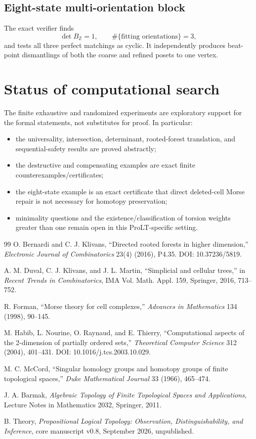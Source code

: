 \documentclass[11pt]{article}
\theoremstyle{definition}
\begin{document}
\subsection*{Eight-state multi-orientation block}
The exact verifier finds
\[
\det B_{\mathbb Z}=1,
\qquad
\#\{\text{fitting orientations}\}=3,
\]
and tests all three perfect matchings as cyclic. It independently produces beat-point dismantlings of both the coarse and refined posets to one vertex.

\section{Status of computational search}

The finite exhaustive and randomized experiments are exploratory support for the formal statements, not substitutes for proof. In particular:
\begin{itemize}
\item the universality, intersection, determinant, rooted-forest translation, and sequential-safety results are proved abstractly;
\item the destructive and compensating examples are exact finite counterexamples/certificates;
\item the eight-state example is an exact certificate that direct deleted-cell Morse repair is not necessary for homotopy preservation;
\item minimality questions and the existence/classification of torsion weights greater than one remain open in this ProLT-specific setting.
\end{itemize}

\begin{thebibliography}{99}
O. Bernardi and C. J. Klivans,
``Directed rooted forests in higher dimension,''
\emph{Electronic Journal of Combinatorics} 23(4) (2016), P4.35.
DOI: 10.37236/5819.

A. M. Duval, C. J. Klivans, and J. L. Martin,
``Simplicial and cellular trees,''
in \emph{Recent Trends in Combinatorics}, IMA Vol. Math. Appl. 159, Springer, 2016, 713--752.

R. Forman,
``Morse theory for cell complexes,''
\emph{Advances in Mathematics} 134 (1998), 90--145.

M. Habib, L. Nourine, O. Raynaud, and E. Thierry,
``Computational aspects of the 2-dimension of partially ordered sets,''
\emph{Theoretical Computer Science} 312 (2004), 401--431.
DOI: 10.1016/j.tcs.2003.10.029.

M. C. McCord,
``Singular homology groups and homotopy groups of finite topological spaces,''
\emph{Duke Mathematical Journal} 33 (1966), 465--474.

J. A. Barmak,
\emph{Algebraic Topology of Finite Topological Spaces and Applications},
Lecture Notes in Mathematics 2032, Springer, 2011.

B. Theory,
\emph{Propositional Logical Topology: Observation, Distinguishability, and Inference},
core manuscript v0.8, September 2026, unpublished.
\end{thebibliography}
\end{document}
